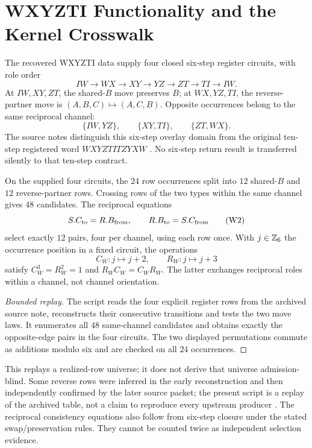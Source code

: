 \begingroup
\renewcommand{\thesection}{13B}
\section{WXYZTI Functionality and the Kernel Crosswalk}\label{sec:wxyzti}
The recovered WXYZTI data supply four closed six-step register circuits, with role order
\[
IW\to WX\to XY\to YZ\to ZT\to TI\to IW.
\]
At $IW,XY,ZT$, the shared-$B$ move preserves $B$; at $WX,YZ,TI$, the reverse-partner move is $(A,B,C)\mapsto(A,C,B)$. Opposite occurrences belong to the same reciprocal channel:
\begin{equation}
\{IW,YZ\},\qquad \{XY,TI\},\qquad \{ZT,WX\}.
\tag{W1}\label{eq:wxyzti-channels}
\end{equation}
The source notes distinguish this six-step overlay domain from the original ten-step registered word $WXYZTITZYXW$ \citep{wxyztirows,wxyzticontract}. No six-step return result is transferred silently to that ten-step contract.

\begin{proposition}\label{prop:wxyzti-bounded}
On the supplied four circuits, the $24$ row occurrences split into $12$ shared-$B$ and $12$ reverse-partner rows. Crossing rows of the two types within the same channel gives $48$ candidates. The reciprocal equations
\begin{equation}
S.C_{\rm to}=R.B_{\rm from},\qquad
R.B_{\rm to}=S.C_{\rm from}
\tag{W2}\label{eq:wxyzti-selector}
\end{equation}
select exactly $12$ pairs, four per channel, using each row once. With $j\in\mathbb Z_6$ the occurrence position in a fixed circuit, the operations
\[
C_W:j\mapsto j+2,\qquad R_W:j\mapsto j+3
\]
satisfy $C_W^3=R_W^2=1$ and $R_WC_W=C_WR_W$. The latter exchanges reciprocal roles within a channel, not channel orientation.
\end{proposition}
\begin{proof}[Bounded replay]
The script  reads the four explicit register rows from the archived source note, reconstructs their consecutive transitions and tests the two move laws. It enumerates all $48$ same-channel candidates and obtains exactly the opposite-edge pairs in the four circuits. The two displayed permutations commute as additions modulo six and are checked on all $24$ occurrences.
\end{proof}
This replays a realized-row universe; it does not derive that universe admission-blind. Some reverse rows were inferred in the early reconstruction and then independently confirmed by the later source packet; the present script is a replay of the archived table, not a claim to reproduce every upstream producer \citep{wxyzticontract}. The reciprocal consistency equations also follow from six-step closure under the stated swap/preservation rules. They cannot be counted twice as independent selection evidence.

